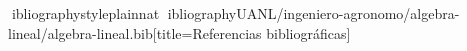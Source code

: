 \documentclass[spanish,letterpaper,oneside]{article}
\begin{document}
\hypersetup{pageanchor=false}
\begingroup
\fontsize{14}{17}\selectfont
\renewcommand{\Huge}{\fontsize{14}{17}\selectfont\bfseries}
\renewcommand{\large}{\fontsize{14}{17}\selectfont}
\templatePortrait
\clearpage
\endgroup
\hypersetup{pageanchor=true}
\templatePagecfg
\singlespacing
\setlength{\tabcolsep}{8pt}
\renewcommand{\arraystretch}{1.18}

\newpage
ibliographystyle{plainnat}
ibliography{UANL/ingeniero-agronomo/algebra-lineal/algebra-lineal.bib}[title={Referencias bibliográficas}]
\end{document}
